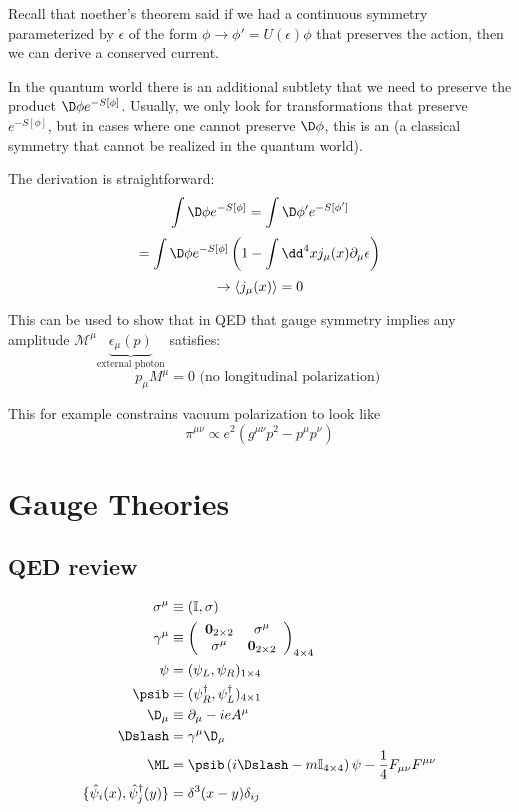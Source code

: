 \documentclass[11pt]{scrartcl}
\begin{document}
Recall that noether's theorem said if we had a continuous symmetry parameterized by $\epsilon$ of the form $\phi \rightarrow \phi' = U(\epsilon) \phi$ that preserves the action, then we can derive a conserved current.

In the quantum world there is an additional subtlety that we need to preserve the product $\D \phi e^{- S[\phi]}$.  Usually, we only look for transformations that preserve $e^{-S[\phi]}$, but in cases where one cannot preserve $\D \phi$, this is an  (a classical symmetry that cannot be realized in the quantum world).

The derivation is straightforward:
\[ \int \D \phi e^{- S[\phi]} = \int \D \phi' e^{- S[\phi']} \]
\[ = \int \D \phi e^{-S[\phi]} \left( 1 - \int \dd^4 x j_\mu(x) \partial_\mu \epsilon \right) \]
\[\rightarrow \braket{j_\mu(x)} = 0 \]

This can be used to show that in QED that gauge symmetry implies any amplitude $\mathcal{M}^\mu \underbrace{\epsilon_\mu(p)}_{\text{external photon}}$ satisfies:
\[ p_\mu M^\mu  = 0 \text{ (no  longitudinal polarization) } \]

This for example constrains vacuum polarization to look like
\[ \pi^{\mu \nu} \propto e^2 (g^{\mu \nu}p^2 - p^\mu p^\nu ) \]



\section{Gauge Theories}

\subsection{QED review}
\begin{align}
	\sigma^{\mu} &\equiv (\mathbb{I}, \mathbf{\sigma}) \\
	\gamma^\mu &\equiv 
	\left( \begin{array}{cc}
		\mathbf{0}_{2 \times 2} & \sigma^\mu \\
		\sigma^\mu & \mathbf{0}_{2 \times 2}
		\end{array} \right)_{4 \times 4} \\
	\psi &= (\psi_L, \psi_R)_{1 \times 4} \\
	\psib &= (\psi_R^\dagger, \psi_L^\dagger)_{4 \times 1} \\
	\D_\mu &\equiv \partial_\mu - i e A^\mu \\
	\Dslash &= \gamma^\mu \D_\mu \\
	\ML &= \psib \left(i \Dslash - m \mathbb{I}_{4 \times 4} \right) \psi - \frac14 F_{\mu \nu} F^{\mu \nu} \\
	\{\hat{\psi}_i(x),  \hat{\psi}_j^\dagger (y) \} & = \delta^3(x -y) \delta_{ij}
	\end{align}
\end{document}
